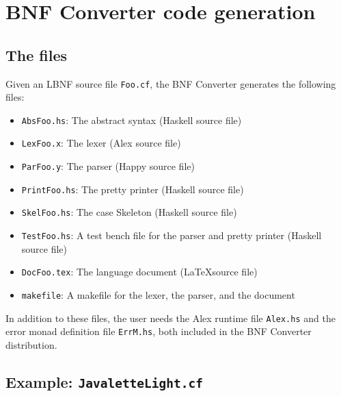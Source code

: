 \documentclass[10pt]{article}
\begin{document}
\section{BNF Converter code generation}

\subsection{The files}

Given an LBNF source file {\tt Foo.cf}, 
the BNF Converter generates the following files:
\begin{itemize}
 \item {\tt AbsFoo.hs}: The abstract syntax (Haskell source file)
 \item {\tt LexFoo.x}: The lexer (Alex source file)
 \item {\tt ParFoo.y}: The parser (Happy source file)
 \item {\tt PrintFoo.hs}: The pretty printer (Haskell source file)
 \item {\tt SkelFoo.hs}: The case Skeleton (Haskell source file)
 \item {\tt TestFoo.hs}: A test bench file for the parser and pretty printer (Haskell source file)
 \item {\tt DocFoo.tex}: The language document (\LaTeX source file)
 \item {\tt makefile}: A makefile for the lexer, the parser, and the document
\end{itemize}
In addition to these files, the user needs the Alex runtime file
{\tt Alex.hs} and the error monad definition file {\tt ErrM.hs}, both
included in the BNF Converter distribution.



\subsection{Example: {\tt JavaletteLight.cf}}
\end{document}
